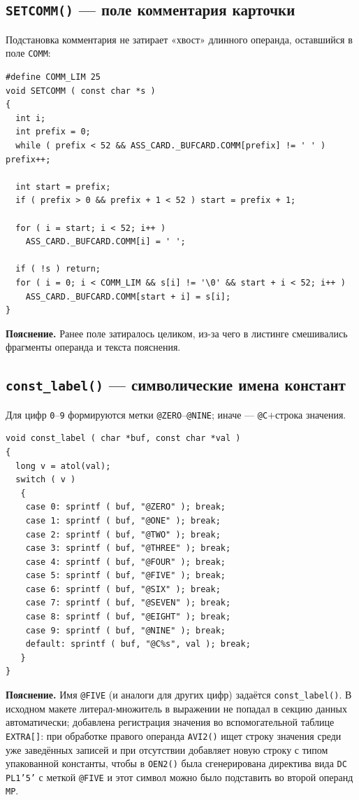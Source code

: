 \documentclass[a4paper,14pt]{extarticle}
\begin{document}
\subsection{\texttt{SETCOMM()} — поле комментария карточки}

Подстановка комментария не затирает «хвост» длинного операнда, оставшийся в поле
\texttt{COMM}:

\begin{lstlisting}[style=Cstyle,caption={Запись \texttt{COMM} с сохранением хвоста операнда},label=lst:setcomm]
#define COMM_LIM 25
void SETCOMM ( const char *s )
{
  int i;
  int prefix = 0;
  while ( prefix < 52 && ASS_CARD._BUFCARD.COMM[prefix] != ' ' ) prefix++;

  int start = prefix;
  if ( prefix > 0 && prefix + 1 < 52 ) start = prefix + 1;

  for ( i = start; i < 52; i++ )
    ASS_CARD._BUFCARD.COMM[i] = ' ';

  if ( !s ) return;
  for ( i = 0; i < COMM_LIM && s[i] != '\0' && start + i < 52; i++ )
    ASS_CARD._BUFCARD.COMM[start + i] = s[i];
}
\end{lstlisting}
\textbf{Пояснение.} Ранее поле затиралось целиком, из-за чего в листинге смешивались
фрагменты операнда и текста пояснения.

\subsection{\texttt{const\_label()} — символические имена констант}

Для цифр \texttt{0}--\texttt{9} формируются метки \texttt{@ZERO}--\texttt{@NINE};
иначе — \texttt{@C}$+$строка значения.

\begin{lstlisting}[style=Cstyle,caption={Имя упакованной константы для \texttt{MP}},label=lst:const_label]
void const_label ( char *buf, const char *val )
{
  long v = atol(val);
  switch ( v )
   {
    case 0: sprintf ( buf, "@ZERO" ); break;
    case 1: sprintf ( buf, "@ONE" ); break;
    case 2: sprintf ( buf, "@TWO" ); break;
    case 3: sprintf ( buf, "@THREE" ); break;
    case 4: sprintf ( buf, "@FOUR" ); break;
    case 5: sprintf ( buf, "@FIVE" ); break;
    case 6: sprintf ( buf, "@SIX" ); break;
    case 7: sprintf ( buf, "@SEVEN" ); break;
    case 8: sprintf ( buf, "@EIGHT" ); break;
    case 9: sprintf ( buf, "@NINE" ); break;
    default: sprintf ( buf, "@C%s", val ); break;
   }
}
\end{lstlisting}
\textbf{Пояснение.} Имя \texttt{@FIVE} (и аналоги для других цифр) задаётся
\texttt{const\_label()}. В исходном макете литерал-множитель в выражении не
попадал в секцию данных автоматически; добавлена регистрация значения во
вспомогательной таблице \texttt{EXTRA[]}: при обработке правого операнда
\texttt{AVI2()} ищет строку значения среди уже заведённых записей и при отсутствии
добавляет новую строку с типом упакованной константы, чтобы в \texttt{OEN2()}
была сгенерирована директива вида \texttt{DC PL1'5'} с меткой \texttt{@FIVE} и
этот символ можно было подставить во второй операнд \texttt{MP}.
\end{document}
